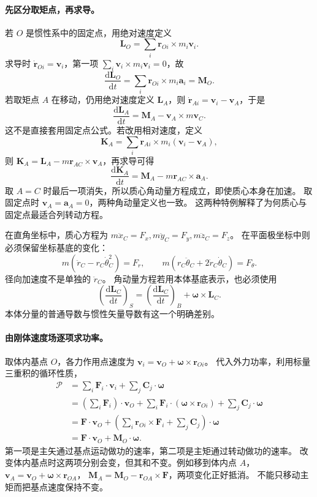 \documentclass[UTF8,zihao=-4,fontset=fandol,a4paper]{ctexart}
\newcommand{\vect}[1]{\bm{#1}}
\newcommand{\dd}{\mathrm d}
\begin{document}
\paragraph{先区分取矩点，再求导。}
若 $O$ 是惯性系中的固定点，用绝对速度定义
\[
\vect L_O=\sum_i\vect r_{Oi}\times m_i\vect v_i.
\]
求导时 $\dot{\vect r}_{Oi}=\vect v_i$，第一项
$\sum_i\vect v_i\times m_i\vect v_i=0$，故
\[
\frac{\dd\vect L_O}{\dd t}=\sum_i\vect r_{Oi}\times m_i\vect a_i
=\vect M_O.
\]
若取矩点 $A$ 在移动，仍用绝对速度定义 $\vect L_A$，则
$\dot{\vect r}_{Ai}=\vect v_i-\vect v_A$，于是
\[
\frac{\dd\vect L_A}{\dd t}
=\vect M_A-\vect v_A\times m\vect v_C.
\]
这不是直接套用固定点公式。若改用相对速度，定义
\[
\vect K_A=\sum_i\vect r_{Ai}\times m_i(\vect v_i-\vect v_A),
\]
则 $\vect K_A=\vect L_A-m\vect r_{AC}\times\vect v_A$，再求导可得
\[
\frac{\dd\vect K_A}{\dd t}
=\vect M_A-m\vect r_{AC}\times\vect a_A.
\]
取 $A=C$ 时最后一项消失，所以质心角动量方程成立，即使质心本身在加速。
取固定点时 $\vect v_A=\vect a_A=0$，两种角动量定义也一致。
这两种特例解释了为何质心与固定点最适合列转动方程。

在直角坐标中，质心方程为
$m\ddot x_C=F_x,m\ddot y_C=F_y,m\ddot z_C=F_z$。
在平面极坐标中则必须保留坐标基底的变化：
\[
m(\ddot r_C-r_C\dot\theta_C^2)=F_r,\qquad
m(r_C\ddot\theta_C+2\dot r_C\dot\theta_C)=F_\theta.
\]
径向加速度不是单独的 $\ddot r_C$。
角动量方程若用本体基底表示，也必须使用
\[
\left(\frac{\dd\vect L_C}{\dd t}\right)_{\!S}
=\left(\frac{\dd\vect L_C}{\dd t}\right)_{\!B}
+\vect\omega\times\vect L_C.
\]
本体分量的普通导数与惯性矢量导数有这一个明确差别。

\paragraph{由刚体速度场逐项求功率。}
取体内基点 $O$，各力作用点速度为
$\vect v_i=\vect v_O+\vect\omega\times\vect r_{Oi}$。
代入外力功率，利用标量三重积的循环性质，
\begin{align*}
\mathcal P
&=\sum_i\vect F_i\cdot\vect v_i+\sum_j\vect C_j\cdot\vect\omega\\
&=\left(\sum_i\vect F_i\right)\cdot\vect v_O
+\sum_i\vect F_i\cdot(\vect\omega\times\vect r_{Oi})
+\sum_j\vect C_j\cdot\vect\omega\\
&=\vect F\cdot\vect v_O+
\left(\sum_i\vect r_{Oi}\times\vect F_i+\sum_j\vect C_j\right)\cdot\vect\omega\\
&=\vect F\cdot\vect v_O+\vect M_O\cdot\vect\omega.
\end{align*}
第一项是主矢通过基点运动做功的速率，第二项是主矩通过转动做功的速率。
改变体内基点时这两项分别会变，但其和不变。例如移到体内点 $A$，
$\vect v_A=\vect v_O+\vect\omega\times\vect r_{OA}$，
$\vect M_A=\vect M_O-\vect r_{OA}\times\vect F$，两项变化正好抵消。
不能只移动主矩而把基点速度保持不变。
\end{document}
